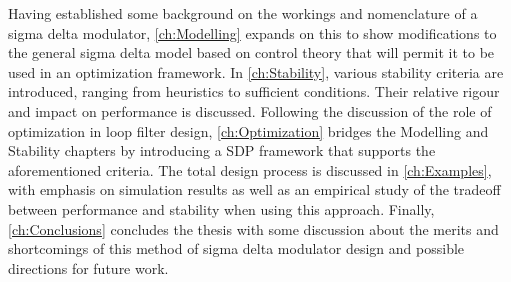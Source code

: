 Having established some background on the workings and nomenclature of a sigma delta modulator, \autoref{ch:Modelling} expands on this to show modifications to the general sigma delta model based on control theory that will permit it to be used in an optimization framework. In \autoref{ch:Stability}, various stability criteria are introduced, ranging from heuristics to sufficient conditions. Their relative rigour and impact on performance is discussed. Following the discussion of the role of optimization in loop filter design, \autoref{ch:Optimization} bridges the Modelling and Stability chapters by introducing a \gls{SDP} framework that supports the aforementioned criteria. The total design process is discussed in \autoref{ch:Examples}, with emphasis on simulation results as well as an empirical study of the tradeoff between performance and stability when using this approach. Finally, \autoref{ch:Conclusions} concludes the thesis with some discussion about the merits and shortcomings of this method of sigma delta modulator design and possible directions for future work.

\endinput
